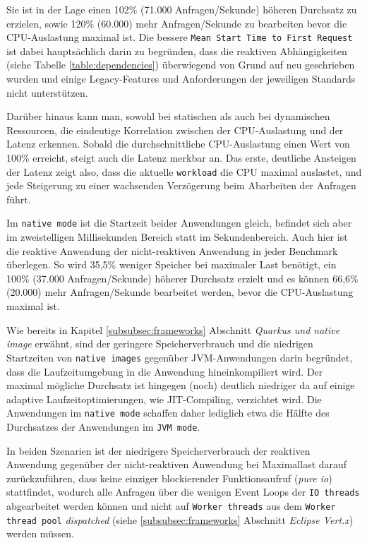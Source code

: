Sie ist in der Lage einen 102\% (71.000 Anfragen/Sekunde) höheren Durchsatz zu erzielen,
sowie 120\% (60.000) mehr Anfragen/Sekunde zu bearbeiten bevor die CPU-Auslastung maximal ist.
Die bessere \verb|Mean Start Time to First Request| ist dabei hauptsächlich darin zu begründen, dass die reaktiven
Abhängigkeiten (siehe Tabelle \ref{table:dependencies})
überwiegend von Grund auf neu geschrieben wurden und einige Legacy-Features und Anforderungen der jeweiligen
Standards nicht unterstützen.

Darüber hinaus kann man, sowohl bei statischen als auch bei dynamischen Ressourcen, die eindeutige Korrelation zwischen der
CPU-Auslastung und der Latenz erkennen.
Sobald die durchschnittliche CPU-Auslastung einen Wert von 100\% erreicht, steigt auch die Latenz merkbar an.
Das erste, deutliche Ansteigen der Latenz zeigt also, dass die aktuelle \verb|workload| die CPU maximal auslastet,
und jede Steigerung zu einer wachsenden Verzögerung beim Abarbeiten der Anfragen führt.

Im \verb|native mode| ist die Startzeit beider Anwendungen gleich, befindet sich aber im zweistelligen Millisekunden Bereich statt
im Sekundenbereich.
Auch hier ist die reaktive Anwendung der nicht-reaktiven Anwendung in jeder Benchmark überlegen. So wird 35,5\% weniger Speicher bei maximaler Last
benötigt, ein 100\% (37.000 Anfragen/Sekunde) höherer  Durchsatz erzielt und es können 66,6\% (20.000) mehr Anfragen/Sekunde bearbeitet
werden, bevor die CPU-Auslastung maximal ist.

Wie bereits in Kapitel \ref{subsubsec:frameworks} Abschnitt \textit{Quarkus und native image} erwähnt, sind der geringere Speicherverbrauch und
die niedrigen Startzeiten von \verb|native images| gegenüber JVM-Anwendungen darin begründet, dass die Laufzeitumgebung in die
Anwendung hineinkompiliert wird. Der maximal mögliche Durchsatz ist hingegen (noch) deutlich niedriger da auf einige adaptive
Laufzeitoptimierungen, wie JIT-Compiling, verzichtet wird. Die Anwendungen im \verb|native mode| schaffen daher lediglich
etwa die Hälfte des Durchsatzes der Anwendungen im \verb|JVM mode|.

In beiden Szenarien ist der niedrigere Speicherverbrauch der reaktiven Anwendung gegenüber der nicht-reaktiven Anwendung
bei Maximallast darauf zurückzuführen, dass
keine einziger blockierender Funktionsaufruf (\textit{pure io}) stattfindet, wodurch alle Anfragen über die wenigen
Event Loops der \verb|IO threads| abgearbeitet werden können und nicht auf \verb|Worker threads| aus dem \verb|Worker thread pool|
\textit{dispatched} (siehe \ref{subsubsec:frameworks} Abschnitt \textit{Eclipse Vert.x}) werden müssen.

